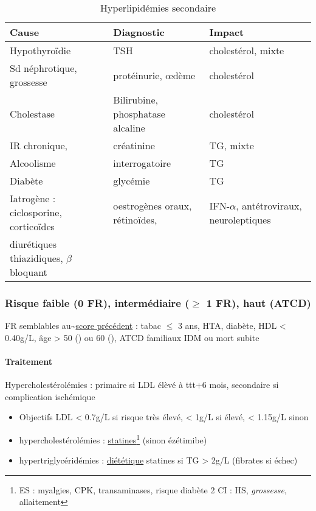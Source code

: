 \documentclass{book}
\begin{document}
\begin{table}[htbp]
\caption{\label{tab:orgfa18aae}
Hyperlipidémies secondaire}
\centering
\begin{tabular}{lll}
\toprule
Cause & Diagnostic & Impact\\
\midrule
Hypothyroïdie & TSH & cholestérol, mixte\\
Sd néphrotique, grossesse & protéinurie, \oe{}dème & cholestérol\\
Cholestase & Bilirubine, phosphatase alcaline & cholestérol\\
IR chronique, & créatinine & TG, mixte\\
Alcoolisme & interrogatoire & TG\\
Diabète & glycémie & TG\\
\midrule
Iatrogène : ciclosporine, corticoïdes & oestrogènes oraux, rétinoïdes, & IFN-\(\alpha\), antétroviraux, neuroleptiques\\
diurétiques thiazidiques, \(\beta\)bloquant &  & \\
\bottomrule
\end{tabular}
\end{table}

\subsubsection{Risque faible (0 FR), intermédiaire (\(\ge\) 1 FR), haut (ATCD)}
\label{sec:org7253481}

FR semblables au\textasciitilde{}\hyperref[subsec:fr]{score précédent} : tabac \(\le\) 3 ans, HTA, diabète, HDL < 0.40g/L, âge > 50
(\male) ou 60 (\female), ATCD familiaux IDM ou mort subite

\paragraph{Traitement}
\label{sec:orgfde9489}
Hypercholestérolémies : primaire si LDL élèvé à ttt+6 mois, secondaire si complication ischémique
\begin{itemize}
\item Objectifs LDL < 0.7g/L si risque très élevé, < 1g/L si élevé, < 1.15g/L sinon
\item hypercholestérolémies : \uline{statines}\footnote{ES : myalgies, \inc CPK, \inc transaminases, \inc risque diabète 2
CI : HS, \emph{grossesse}, allaitement} (sinon ézétimibe)
\item hypertriglycéridémies : \uline{diététique} \textpm{} statines si TG > 2g/L (fibrates si échec)
\end{itemize}
\end{document}
